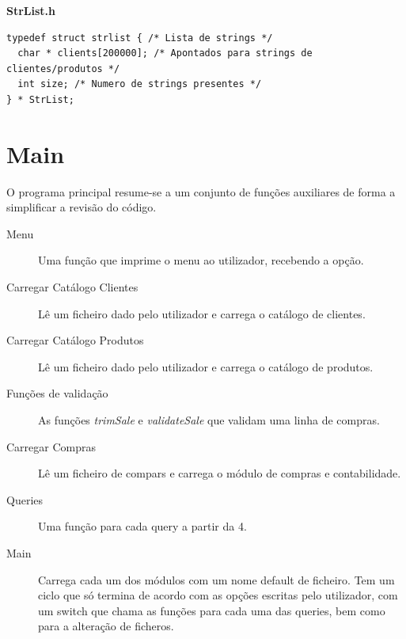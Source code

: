 \documentclass[10pt] {article}
\begin{document}
\textbf{StrList.h}
\begin{lstlisting}
typedef struct strlist { /* Lista de strings */
  char * clients[200000]; /* Apontados para strings de clientes/produtos */
  int size; /* Numero de strings presentes */
} * StrList;
\end{lstlisting}

\newpage
\section{Main}
\par O programa principal resume-se a um conjunto de funções auxiliares de forma a simplificar a revisão do código.

\begin{description}
  \item[Menu] Uma função que imprime o menu ao utilizador, recebendo a opção.

  \item[Carregar Catálogo Clientes] Lê um ficheiro dado pelo utilizador e carrega o catálogo de clientes.

  \item[Carregar Catálogo Produtos] Lê um ficheiro dado pelo utilizador e carrega o catálogo de produtos.

  \item[Funções de validação] As funções \emph{trimSale} e \emph{validateSale} que validam uma linha de compras.

  \item[Carregar Compras] Lê um ficheiro de compars e carrega o módulo de compras e contabilidade.

  \item[Queries] Uma função para cada query a partir da 4.

  \item[Main] Carrega cada um dos módulos com um nome default de ficheiro. Tem um ciclo que só termina de acordo com as opções escritas pelo utilizador, com um switch que chama as funções para cada uma das queries, bem como para a alteração de ficheros.

\end{description}

\newpage
\end{document}
